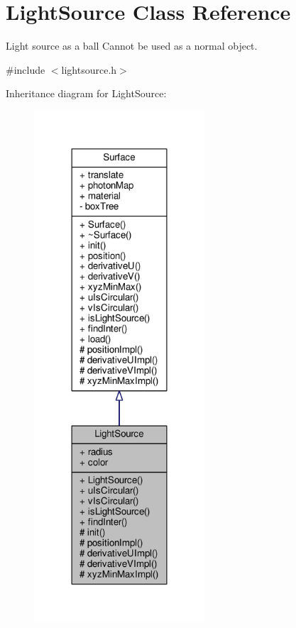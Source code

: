\hypertarget{classLightSource}{}\section{Light\+Source Class Reference}
\label{classLightSource}


Light source as a ball Cannot be used as a normal object.  




{\ttfamily \#include $<$lightsource.\+h$>$}



Inheritance diagram for Light\+Source\+:
\nopagebreak
\begin{figure}[H]
\begin{center}
\leavevmode
\includegraphics[width=180pt]{classLightSource__inherit__graph}
\end{center}
\end{figure}



